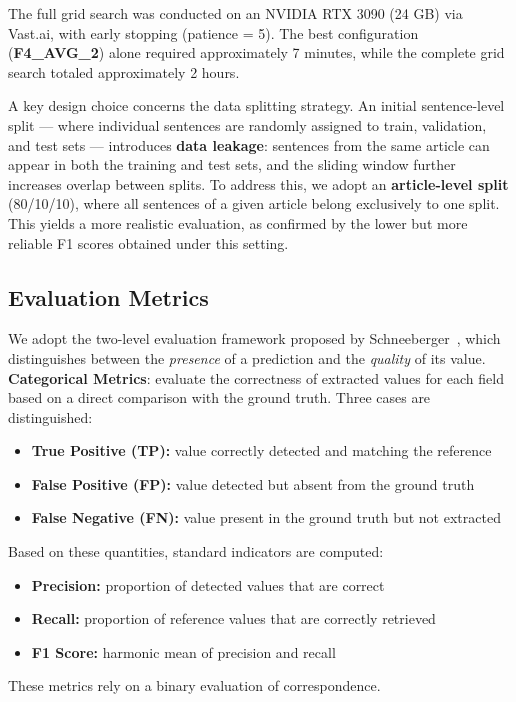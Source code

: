 \documentclass{article}
\theoremstyle{plain}
\theoremstyle{definition}
\theoremstyle{remark}
\begin{document}
The full grid search was conducted on an NVIDIA RTX 3090 (24 GB) via Vast.ai, with early stopping (patience = 5). The best configuration (\textbf{F4\_AVG\_2}) alone required approximately 7 minutes, while the complete grid search totaled approximately 2 hours.

A key design choice concerns the data splitting strategy. An initial sentence-level split — where individual sentences are randomly assigned to train, validation, and test sets — introduces \textbf{data leakage}: sentences from the same article can appear in both the training and test sets, and the sliding window further increases overlap between splits. To address this, we adopt an \textbf{article-level split} (80/10/10), where all sentences of a given article belong exclusively to one split. This yields a more realistic evaluation, as confirmed by the lower but more reliable F1 scores obtained under this setting.

\subsection{Evaluation Metrics} 
We adopt the two-level evaluation framework proposed by Schneeberger~\cite{greenwade93}, which distinguishes between the \emph{presence} of a prediction and the \emph{quality} of its value.\\


\textbf{Categorical Metrics}: evaluate the correctness of extracted values for each field based on a direct comparison with the ground truth. Three cases are distinguished:

\begin{itemize}
    \item \textbf{True Positive (TP):} value correctly detected and matching the reference
    \item \textbf{False Positive (FP):} value detected but absent from the ground truth
    \item \textbf{False Negative (FN):} value present in the ground truth but not extracted
\end{itemize}

Based on these quantities, standard indicators are computed:

\begin{itemize}
    \item \textbf{Precision:} proportion of detected values that are correct
    \item \textbf{Recall:} proportion of reference values that are correctly retrieved
    \item \textbf{F1 Score:} harmonic mean of precision and recall
\end{itemize}
These metrics rely on a binary evaluation of correspondence.\\
\end{document}

